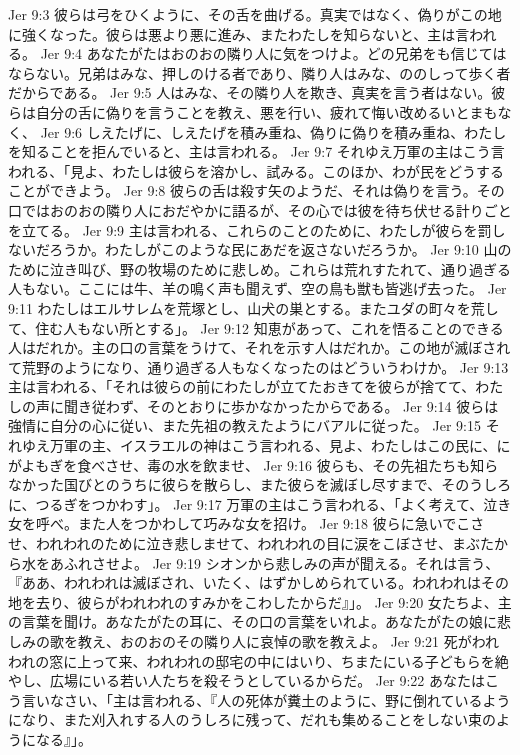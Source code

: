 Jer 9:3  彼らは弓をひくように、その舌を曲げる。真実ではなく、偽りがこの地に強くなった。彼らは悪より悪に進み、またわたしを知らないと、主は言われる。
Jer 9:4  あなたがたはおのおの隣り人に気をつけよ。どの兄弟をも信じてはならない。兄弟はみな、押しのける者であり、隣り人はみな、ののしって歩く者だからである。
Jer 9:5  人はみな、その隣り人を欺き、真実を言う者はない。彼らは自分の舌に偽りを言うことを教え、悪を行い、疲れて悔い改めるいとまもなく、
Jer 9:6  しえたげに、しえたげを積み重ね、偽りに偽りを積み重ね、わたしを知ることを拒んでいると、主は言われる。
Jer 9:7  それゆえ万軍の主はこう言われる、「見よ、わたしは彼らを溶かし、試みる。このほか、わが民をどうすることができよう。
Jer 9:8  彼らの舌は殺す矢のようだ、それは偽りを言う。その口ではおのおの隣り人におだやかに語るが、その心では彼を待ち伏せる計りごとを立てる。
Jer 9:9  主は言われる、これらのことのために、わたしが彼らを罰しないだろうか。わたしがこのような民にあだを返さないだろうか。
Jer 9:10  山のために泣き叫び、野の牧場のために悲しめ。これらは荒れすたれて、通り過ぎる人もない。ここには牛、羊の鳴く声も聞えず、空の鳥も獣も皆逃げ去った。
Jer 9:11  わたしはエルサレムを荒塚とし、山犬の巣とする。またユダの町々を荒して、住む人もない所とする」。
Jer 9:12  知恵があって、これを悟ることのできる人はだれか。主の口の言葉をうけて、それを示す人はだれか。この地が滅ぼされて荒野のようになり、通り過ぎる人もなくなったのはどういうわけか。
Jer 9:13  主は言われる、「それは彼らの前にわたしが立てたおきてを彼らが捨てて、わたしの声に聞き従わず、そのとおりに歩かなかったからである。
Jer 9:14  彼らは強情に自分の心に従い、また先祖の教えたようにバアルに従った。
Jer 9:15  それゆえ万軍の主、イスラエルの神はこう言われる、見よ、わたしはこの民に、にがよもぎを食べさせ、毒の水を飲ませ、
Jer 9:16  彼らも、その先祖たちも知らなかった国びとのうちに彼らを散らし、また彼らを滅ぼし尽すまで、そのうしろに、つるぎをつかわす」。
Jer 9:17  万軍の主はこう言われる、「よく考えて、泣き女を呼べ。また人をつかわして巧みな女を招け。
Jer 9:18  彼らに急いでこさせ、われわれのために泣き悲しませて、われわれの目に涙をこぼさせ、まぶたから水をあふれさせよ。
Jer 9:19  シオンから悲しみの声が聞える。それは言う、『ああ、われわれは滅ぼされ、いたく、はずかしめられている。われわれはその地を去り、彼らがわれわれのすみかをこわしたからだ』」。
Jer 9:20  女たちよ、主の言葉を聞け。あなたがたの耳に、その口の言葉をいれよ。あなたがたの娘に悲しみの歌を教え、おのおのその隣り人に哀悼の歌を教えよ。
Jer 9:21  死がわれわれの窓に上って来、われわれの邸宅の中にはいり、ちまたにいる子どもらを絶やし、広場にいる若い人たちを殺そうとしているからだ。
Jer 9:22  あなたはこう言いなさい、「主は言われる、『人の死体が糞土のように、野に倒れているようになり、また刈入れする人のうしろに残って、だれも集めることをしない束のようになる』」。
